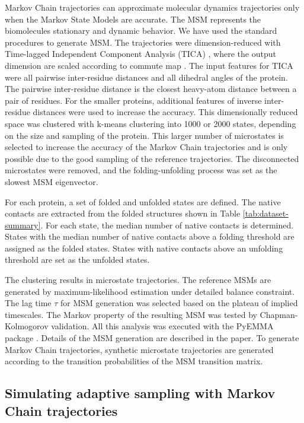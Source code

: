 Markov Chain trajectories can approximate molecular dynamics trajectories only when the Markov State Models are accurate. The MSM represents the biomolecules stationary and dynamic behavior. 
We have used the standard procedures to generate MSM. The trajectories were dimension-reduced with Time-lagged Independent Component Analysis (TICA) 
\cite{TICA1-perez2013, TICA2-schwantes2013}, where the output dimension are scaled according to commute map 
\cite{noe2016commute}. The input features for TICA were all pairwise
inter-residue distances and all dihedral angles of the protein.  The pairwise
inter-residue distance is the closest heavy-atom distance between a pair of residues. 
For the smaller proteins,  additional features of inverse inter-residue distances were used to increase the accuracy. This dimensionally reduced space was clustered with k-means clustering into 1000 or 2000 states, depending on the size and sampling of the protein. This larger number of microstates is selected to increase the accuracy of the Markov Chain trajectories and is only possible due to the good sampling of the reference trajectories. The disconnected microstates were removed, and the folding-unfolding process was set as the slowest MSM eigenvector. 

For each protein, a set of folded and unfolded states are defined. The native contacts are extracted from the folded structures shown in Table \ref{tab:dataset-summary}. For each state, the median number of native
contacts is determined. States with the median number of native contacts above a folding threshold are assigned as the folded states. States with native contacts above an unfolding threshold are set as the unfolded states.

The clustering results in microstate trajectories. The reference MSMs are generated by maximum-likelihood estimation under detailed balance
constraint. The lag time $\tau$ for MSM generation was selected based on the plateau of implied timescales. The Markov property of the resulting MSM was tested by Chapman-Kolmogorov validation. All this
analysis was executed with the PyEMMA package \cite{scherer2015pyemma}. Details of the MSM generation are described in the paper\cite{Adstrategies2018}. To generate Markov Chain trajectories, synthetic microstate trajectories are generated according to the transition probabilities of the MSM transition matrix.

 

\subsection{\label{sec:level5}Simulating adaptive sampling with Markov Chain trajectories}

